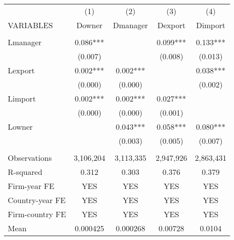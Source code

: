 \begin{tabular}{lcccc} \hline
 & (1) & (2) & (3) & (4) \\
VARIABLES & Downer & Dmanager & Dexport & Dimport \\ \hline
 &  &  &  &  \\
Lmanager & 0.086*** &  & 0.099*** & 0.133*** \\
 & (0.007) &  & (0.008) & (0.013) \\
Lexport & 0.002*** & 0.002*** &  & 0.038*** \\
 & (0.000) & (0.000) &  & (0.002) \\
Limport & 0.002*** & 0.002*** & 0.027*** &  \\
 & (0.000) & (0.000) & (0.001) &  \\
Lowner &  & 0.043*** & 0.058*** & 0.080*** \\
 &  & (0.003) & (0.005) & (0.007) \\
 &  &  &  &  \\
Observations & 3,106,204 & 3,113,335 & 2,947,926 & 2,863,431 \\
R-squared & 0.312 & 0.303 & 0.376 & 0.379 \\
Firm-year FE & YES & YES & YES & YES \\
Country-year FE & YES & YES & YES & YES \\
Firm-country FE & YES & YES & YES & YES \\
 Mean & 0.000425 & 0.000268 & 0.00728 & 0.0104 \\ \hline
\end{tabular}
